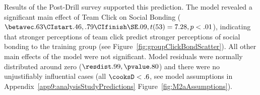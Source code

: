\begin{CJK}{UTF8}{gbsn}
Results of the Post-Drill survey supported this prediction. The model revealed a significant main effect of Team Click on Social Bonding ($\betavec .63 \CIstart .46, .79 \CIfinish \SE .09, t(53) = 7.28, p < .01$), indicating that stronger perceptions of team click predict stronger perceptions of social bonding to the training group (see Figure~\ref{fig:groupClickBondScatter}).  All other main effects of the model were not significant.  Model residuals were normally distributed around zero ($\resdist .99, \pvalue .80$) and there were no unjustifiably influential cases (all $\cooksD < .6$, see model assumptions in Appendix~\ref{app9:analysisStudyPredictions} Figure~\ref{fig:M2aAssumptions}).












\end{CJK}
